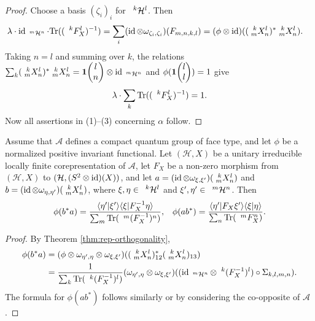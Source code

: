 \begin{proof}
  Choose a basis
  $(\zeta_{i})_{i}$ for $\Gru{\mathcal{H}}{k}{l}$. Then
  \begin{align*}
    \lambda \cdot \id_{\Gru{\mathcal{H}}{m}{n}} \cdot
    \Tr((\Gru{F_{X}}{k}{l})^{-1}) &= \sum_{i} (\id \otimes
    \omega_{\zeta_{i},\zeta_{i}})(F_{m,n,k,l}) = (\phi \otimes
    \id)((\Gr{X}{k}{l}{m}{n})^{*} \Gr{X}{k}{l}{m}{n}).
  \end{align*}
  Taking $n=l$ and summing over $k$, the relations $\sum_{k}
  (\Gr{X}{k}{l}{m}{n})^{*} \Gr{X}{k}{l}{m}{n} = \UnitC{l}{n}
  \otimes \id_{\Gru{\mathcal{H}}{m}{n}}$ and
  $\phi(\UnitC{l}{l})=1$ give
\begin{align*}
\lambda \cdot  \sum_{k} \Tr((\Gru{F_{X}}{k}{l})^{-1}) = 1.
\end{align*}
Now all assertions in (1)--(3) concerning $\alpha$ follow.
\end{proof}
\begin{Cor}\label{CorOrth}
  Assume that $\mathscr{A}$ defines a compact quantum group of face type, and let $\phi$ be a normalized positive  invariant functional. Let $(\mathcal{H},X)$ be a unitary
  irreducible locally finite corepresentation of $\mathscr{A}$, let
  $F_{X}$ be a non-zero morphism from $(\mathcal{H},X)$ to
  $(\mathcal{H},(S^{2} \otimes \id)(X))$, and let $a=(\id \otimes
  \omega_{\xi,\xi'})(\Gr{X}{k}{l}{m}{n})$ and $b=(\id \otimes
  \omega_{\eta,\eta'})(\Gr{X}{k}{l}{m}{n})$, where $\xi,\eta \in
  \Gru{\mathcal{H}}{k}{l}$ and $\xi',\eta' \in \Gru{\mathcal{H}}{m}{n}$.
  Then
\begin{align*}
  \phi(b^{*}a) &= \frac{\langle \eta'|\xi'\rangle \langle
    \xi|F^{-1}_{X}\eta\rangle}{\sum_{m}
    \Tr(\Gru{(F^{-1}_{X})}{m}{n})}, & \phi(ab^{*}) = \frac{\langle
    \eta'|F_{X}\xi'\rangle \langle \xi|\eta\rangle}{\sum_{n}
    \Tr(\Gru{F_{X}}{m}{n})}.
\end{align*}
\end{Cor}
\begin{proof}
  By Theorem \ref{thm:rep-orthogonality}, 
  \begin{align*}
    \phi(b^{*}a) &= (\phi \otimes \omega_{\eta',\eta} \otimes
    \omega_{\xi,\xi'})((\Gr{X}{k}{l}{m}{n})_{12}^{*}(\Gr{X}{k}{l}{m}{n})_{13})
    \\
    &= \frac{1}{\sum_{k} \Tr(\Gru{(F_{X}^{-1})}{k}{l})} 
    (\omega_{\eta',\eta} \otimes
    \omega_{\xi,\xi'})(   (
    \id_{\Gru{\mathcal{H}}{m}{n}} \otimes \Gru{(F_{X}^{-1})}{k}{l})
    \circ \Sigma_{k,l,m,n}). 
  \end{align*}
  The formula for $\phi(ab^{*})$ follows similarly or by considering
  the co-opposite of $\mathscr{A}$.
\end{proof}
